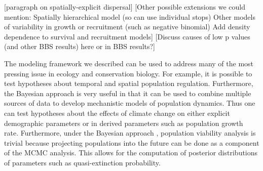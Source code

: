 \documentclass[12pt]{article}
\begin{document}
[paragraph on spatially-explicit dispersal]
[Other possible extensions we could mention:
Spatially hierarchical model (so can use individual stops)
Other models of variability in growth or recruitment (such as negative binomial)
Add density dependence to survival and recruitment models]
[Discuss causes of low p values (and other BBS results) here or in BBS
results?]

The modeling framework we described can be used to address many of the
most pressing issue in ecology and conservation biology. For example,
it is possible to test hypotheses about temporal and spatial
population regulation. Furthermore, the Bayesian approach is very
useful in that it can be used to combine multiple sources of data to
develop mechanistic models of population dynamics. Thus one can test
hypotheses about the effects of climate change on either explicit
demographic parameters or in derived parameters such as population
growth rate. Furthermore, under the Bayesian approach , population
viability analysis is trivial because projecting populations into the
future can be done as a component of the MCMC analysis. This allows
for the computation of posterior distributions of parameters such as
quasi-extinction probability.





\end{document}
